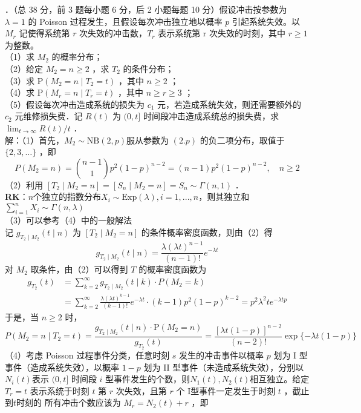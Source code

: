 \documentclass[UTF8]{ctexart}
\begin{document}
．（总 38 分，前 3 题每小题 6 分，后 2 小题每题 10 分）假设冲击按参数为 $\lambda=1$ 的 Poisson 过程发生，且假设每次冲击独立地以概率 $p$ 引起系统失效。以 $M_{r}$ 记使得系统第 $r$ 次失效的冲击数，$T_{r}$ 表示系统第 r 次失效的时刻，其中 $r \geq 1$ 为整数。\\
（1）求 $M_{2}$ 的概率分布；\\
（2）给定 $M_{2}=n \geq 2$ ，求 $T_{2}$ 的条件分布；\\
（3）求 $\mathrm{P}\left(M_{2}=n \mid T_{2}=t\right)$ ，其中 $n \geq 2$ ；\\
（4）求 $\mathrm{P}\left(M_{r}=n \mid T_{r}=t\right)$ ，其中 $n \geq r \geq 3$ ；\\
（5）假设每次冲击造成系统的损失为 $c_{1}$ 元，若造成系统失效，则还需要额外的 $c_{2}$ 元维修损失费．记 $R(t)$ 为 $(0, t]$ 时间段冲击造成系统总的损失费，求 $\lim _{t \rightarrow \infty} R(t) / t$ ．\\
解：（1）首先，$M_{2} \sim \mathrm{NB}(2, p)$服从参数为 $(2 . p)$ 的负二项分布，取值于 $\{2,3, \ldots\}$ ，即
$$
P\left(M_{2}=n\right)=\binom{n-1}{1} p^{2}(1-p)^{n-2}=(n-1) p^{2}(1-p)^{n-2}, \quad n \geq 2
$$
（2）利用 $\left[T_{2} \mid M_{2}=n\right]=\left[S_{n} \mid M_{2}=n\right]=S_{n} \sim \Gamma(n, 1)$ ．\\
\textbf{RK}：$n$个独立的指数分布$X_i \sim \mathrm{Exp}(\lambda),i=1,...,n$，则其独立和$\sum_{i=1}^n X_i \sim \Gamma\left(n,\lambda \right) $\\
（3）可以参考（4）中的一般解法\\
记 $g_{T_{2} \mid M_{2}}(t \mid n)$ 为 $\left[T_{2} \mid M_{2}=n\right]$ 的条件概率密度函数，则由（2）得
$$
g_{T_{2} \mid M_{2}}(t \mid n)=\frac{\lambda(\lambda t)^{n-1}}{(n-1)!} e^{-\lambda t}
$$
对 $M_{2}$ 取条件，由（2）可以得到 $T$ 的概率密度函数为
$$
\begin{aligned}
	g_{T_{2}}(t) & =\sum_{k=2}^{\infty} g_{T_{2} \mid M_{2}}(t \mid k) \cdot P\left(M_{2}=k\right) \\
	& =\sum_{k=2}^{\infty} \frac{\lambda(\lambda t)^{k-1}}{(k-1)!} e^{-\lambda t} \cdot(k-1) p^{2}(1-p)^{k-2}=p^{2} \lambda^{2} t e^{-\lambda t p}
\end{aligned}
$$
于是，当 $n \geq 2$ 时，
$$
P\left(M_{2}=n \mid T_{2}=t\right)=\frac{g_{T_{2} \mid M_{2}}(t \mid n) \cdot \mathrm{P}\left(M_{2}=n\right)}{g_{T_{2}}(t)}=\frac{[\lambda t(1-p)]^{n-2}}{(n-2)!} \exp \{-\lambda t(1-p)\}
$$
（4）考虑 Poisson 过程事件分类，任意时刻 $s$ 发生的冲击事件以概率 $p$ 划为 I 型事件（造成系统失效），以概率 $1-p$ 划为 II 型事件（未造成系统失效），分别以 $N_{i}(t)$表示 $(0, t]$ 时间段 $i$ 型事件发生的个数，则$N_1(t),N_2(t)$相互独立。给定 $T_{r}=t$ 表示系统于时刻 $t$ 第 $r$ 次失效，且第 $r$ 个 I型事件一定发生于时刻 $t$ ，截止到$t$时刻的 所有冲击个数应该为 $M_r=N_{2}(t)+r$ ，即
\end{document}
